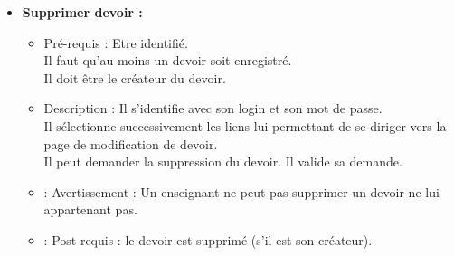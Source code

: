 \begin{itemize}
\item {\bf Supprimer devoir :}
	\begin{itemize}
	\item Pr{\'e}-requis : Etre identifi{\'e}.\\
	Il faut qu'au moins un devoir soit enregistr{\'e}.\\
	Il doit {\^e}tre le cr{\'e}ateur du devoir.
	\item Description : Il s'identifie avec son login et son mot de passe.\\
	Il s{\'e}lectionne successivement les liens lui permettant de se diriger vers la page de modification de devoir.\\
	Il peut demander la suppression du devoir. Il valide sa demande.
	\item : Avertissement : Un enseignant ne peut pas supprimer un devoir ne lui appartenant pas.
	\item : Post-requis : le devoir est supprim{\'e} (s'il est son cr{\'e}ateur).\\
	\end{itemize}
\end{itemize}
